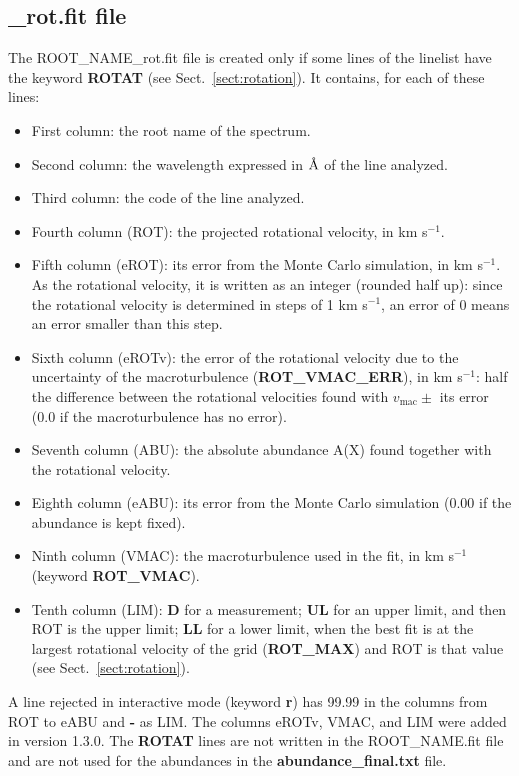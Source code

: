 \documentclass[modern]{aastex701}
\newcommand{\angstrom}{\mbox{\normalfont\AA}}
\begin{document}
\subsection{\_rot.fit file} \label{sect:rot_fit}
The ROOT\_NAME\_rot.fit file is created only if some lines of the linelist have the keyword {\bf ROTAT} (see Sect.~\ref{sect:rotation}). It contains, for each of these lines:
\begin{itemize}
    \item First column: the root name of the spectrum.
    \item Second column: the wavelength expressed in $\angstrom$ of the line analyzed.
    \item Third column: the code of the line analyzed.
    \item Fourth column (ROT): the projected rotational velocity, in km s$^{-1}$.
    \item Fifth column (eROT): its error from the Monte Carlo simulation, in km s$^{-1}$. As the rotational velocity, it is written as an integer (rounded half up): since the rotational velocity is determined in steps of 1 km s$^{-1}$, an error of 0 means an error smaller than this step.
    \item Sixth column (eROTv): the error of the rotational velocity due to the uncertainty of the macroturbulence ({\bf ROT\_VMAC\_ERR}), in km s$^{-1}$: half the difference between the rotational velocities found with $v_{\mathrm{mac}} \pm$ its error (0.0 if the macroturbulence has no error).
    \item Seventh column (ABU): the absolute abundance A(X) found together with the rotational velocity.
    \item Eighth column (eABU): its error from the Monte Carlo simulation (0.00 if the abundance is kept fixed).
    \item Ninth column (VMAC): the macroturbulence used in the fit, in km s$^{-1}$ (keyword {\bf ROT\_VMAC}).
    \item Tenth column (LIM): {\bf D} for a measurement; {\bf UL} for an upper limit, and then ROT is the upper limit; {\bf LL} for a lower limit, when the best fit is at the largest rotational velocity of the grid ({\bf ROT\_MAX}) and ROT is that value (see Sect.~\ref{sect:rotation}).
\end{itemize}
A line rejected in interactive mode (keyword {\bf r}) has 99.99 in the columns from ROT to eABU and {\bf -} as LIM. The columns eROTv, VMAC, and LIM were added in version 1.3.0. The {\bf ROTAT} lines are not written in the ROOT\_NAME.fit file and are not used for the abundances in the {\bf abundance\_final.txt} file. 
\end{document}
